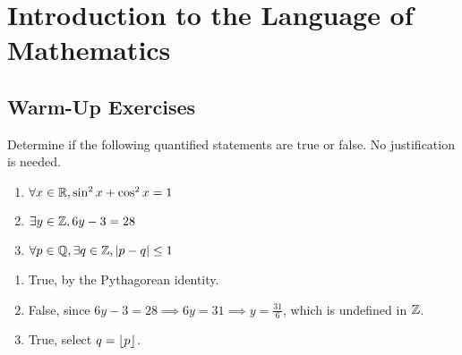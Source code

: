 \chapter{Introduction to the Language of Mathematics}

\section{Warm-Up Exercises}
\begin{warmup}
  Determine if the following quantified statements are true or false.
  No justification is needed.
  \begin{enumerate}
    \item $\forall x\in\mathbb{R}, \sin^2x+\cos^2x=1$
    \item $\exists y\in\mathbb{Z}, 6y-3=28$
    \item $\forall p\in\mathbb{Q}, \exists q\in\mathbb{Z}, |p-q| \leq 1$
  \end{enumerate}
\end{warmup}
\begin{sol}
  \begin{enumerate}
    \item True, by the Pythagorean identity.
    \item False, since $6y-3=28 \implies 6y=31 \implies y=\frac{31}{6}$, which is undefined in $\mathbb{Z}$.
    \item True, select $q = \lfloor p\rfloor$. \qedhere
  \end{enumerate}
\end{sol}

